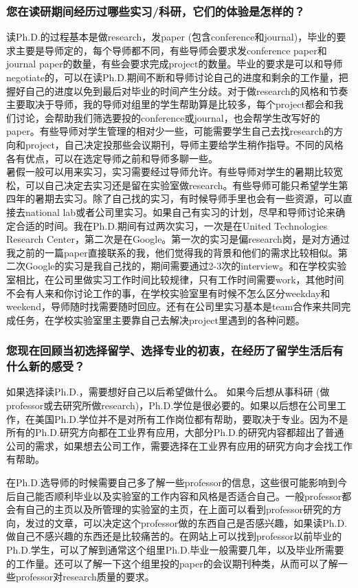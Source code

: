 \documentclass[a4paper,UTF8]{book}
\begin{document}
    \subsubsection*{您在读研期间经历过哪些实习/科研，它们的体验是怎样的？}
    读Ph.D.的过程基本是做research，发paper (包含conference和journal)，毕业的要求主要是导师定的，每个导师都不同，有些导师会要求发conference paper和journal paper的数量，有些会要求完成project的数量。毕业的要求是可以和导师negotiate的，可以在读Ph.D.期间不断和导师讨论自己的进度和剩余的工作量，把握好自己的进度以免到最后对毕业的时间产生分歧。对于做research的风格和节奏主要取决于导师，我的导师对组里的学生帮助算是比较多，每个project都会和我们讨论，会帮助我们筛选要投的conference或journal，也会帮学生改写好的paper。有些导师对学生管理的相对少一些，可能需要学生自己去找research的方向和project，自己决定投那些会议期刊，导师主要给学生稍作指导。不同的风格各有优点，可以在选定导师之前和导师多聊一些。\\
    暑假一般可以用来实习，实习需要经过导师允许。有些导师对学生的暑期比较宽松，可以自己决定去实习还是留在实验室做research。有些导师可能只希望学生第四年的暑期去实习。除了自己找的实习，有时候导师手里也会有一些资源，可以直接去national lab或者公司里实习。如果自己有实习的计划，尽早和导师讨论来确定合适的时间。我在Ph.D.期间有过两次实习，一次是在United Technologies Research Center，第二次是在Google。第一次的实习是偏research岗，是对方通过我之前的一篇paper直接联系的我，他们觉得我的背景和他们的需求比较相似。第二次Google的实习是我自己找的，期间需要通过2-3次的interview。和在学校实验室相比，在公司里做实习工作时间比较规律，只有工作时间需要work，其他时间不会有人来和你讨论工作的事，在学校实验室里有时候不怎么区分weekday和weekend，导师随时找需要随时回应。还有在公司里实习基本是team合作来共同完成任务，在学校实验室里主要靠自己去解决project里遇到的各种问题。

    \subsubsection*{您现在回顾当初选择留学、选择专业的初衷，在经历了留学生活后有什么新的感受？}
    如果选择读Ph.D.，需要想好自己以后希望做什么。 如果今后想从事科研 (做professor或去研究所做research)，Ph.D.学位是很必要的。如果以后想在公司里工作，在美国Ph.D.学位并不是对所有工作岗位都有帮助，要取决于专业。因为不是所有的Ph.D.研究方向都在工业界有应用，大部分Ph.D.的研究内容都超出了普通公司的需求，如果想去公司工作，需要选择在工业界有应用的研究方向才会找工作有帮助。

    在Ph.D.选导师的时候需要自己多了解一些professor的信息，这些很可能影响到今后自己能否顺利毕业以及实验室的工作内容和风格是否适合自己。一般professor都会有自己的主页以及所管理的实验室的主页，在上面可以看到professor研究的方向，发过的文章，可以决定这个professor做的东西自己是否感兴趣，如果读Ph.D.做自己不感兴趣的东西还是比较痛苦的。在网站上可以找到professor以前毕业的Ph.D.学生，可以了解到通常这个组里Ph.D.毕业一般需要几年，以及毕业所需要的工作量。还可以了解一下这个组里投的paper的会议期刊种类，从而可以了解一些professor对research质量的要求。
\end{document}
